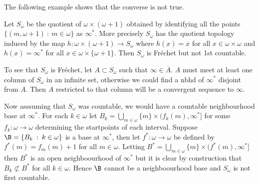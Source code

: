 \documentclass{article}
\begin{document}
The following example shows that the converse is not true. 
\begin{exam}
    Let \(S_{\omega}\) be the quotient of \(\omega \times (\omega + 1)\) obtained by identifying all the points \(\{(m, \omega + 1) \: : \: m \in \omega\}\) as \(\infty^{\ast}\). More precisely \(S_{\omega}\) has the quotient topology induced by the map \(h: \omega \times (\omega + 1) \to S_{\omega}\) where \(h(x) = x\) for all \(x \in \omega \times \omega\) and \(h(x) = \infty^{\ast}\) for all \(x \in \omega \times \{\omega + 1\}\). Then \(S_{\omega}\) is Fréchet but not 1st countable. 
    
    To see that \(S_{\omega}\) is Fréchet, let \(A \subset S_{\omega}\) such that \(\infty \in \overline{A}\). \(A\) must meet at least one column of \(S_{\omega}\) in an infinite set, otherwise we could find a nbhd of \(\infty^{\ast}\) disjoint from \(A\). Then \(A\) restricted to that column will be a convergent sequence to \(\infty\).
    
    Now asssuming that \(S_{\omega}\) was countable, we would have a countable neighbourhood base at \(\infty^{\ast}\). For each \(k \in \omega\) let \(B_k = \bigcup_{m \in \omega}\{m\} \times (f_k(m), \infty^{\ast}]\) for some \(f_k: \omega \to \omega\) determining the startpoints of each interval. Suppose \(\B = \{B_k \: : \: k \in \omega\}\) is a base at \(\infty^{\ast}\), then let \(f^{\ast}: \omega \to \omega\) be defined by \(f^{\ast}(m) = f_m(m) + 1\) for all \(m \in \omega\). Letting \(B^{\ast} = \bigcup_{m \in \omega}\{m\} \times (f^{\ast}(m), \infty^{\ast}]\) then \(B^{\ast}\) is an open neighboourhood of \(\infty^{\ast}\) but it is clear by construction that \(B_k \not\subset B^{\ast}\) for all \(k \in \omega\). Hence \(\B\) cannot be a neighboourhood base and   \(S_{\omega}\) is not first countable.
\end{exam}
\end{document}
